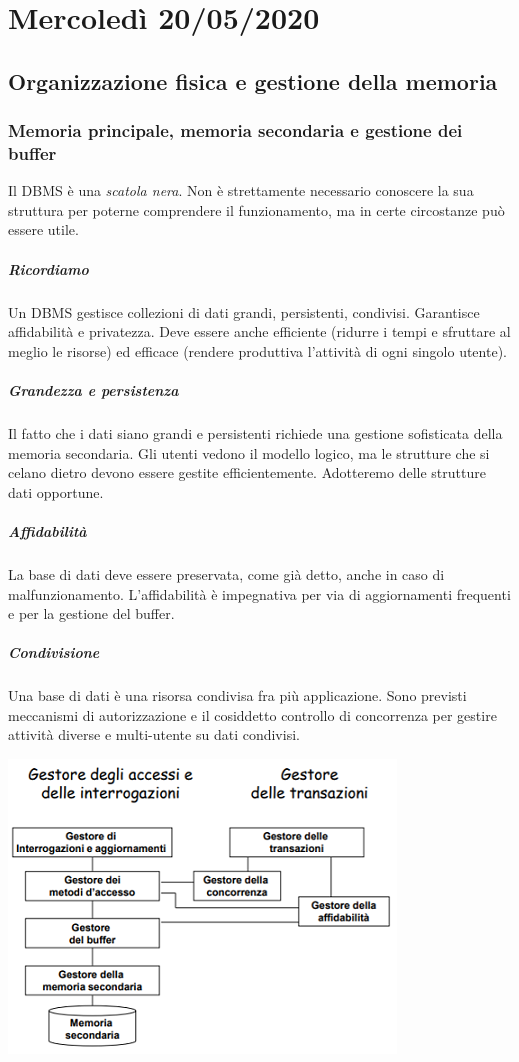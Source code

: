 \chapter{Mercoledì 20/05/2020}
\section{Organizzazione fisica e gestione della memoria}
\subsection{Memoria principale, memoria secondaria e gestione dei buffer}
Il DBMS è una \emph{scatola nera}. Non è strettamente necessario conoscere la sua struttura per poterne comprendere il funzionamento, ma in certe circostanze può essere utile.
\paragraph{Ricordiamo} Un DBMS gestisce collezioni di dati grandi, persistenti, condivisi. Garantisce affidabilità e privatezza. Deve essere anche efficiente (ridurre i tempi e sfruttare al meglio le risorse) ed efficace (rendere produttiva l'attività di ogni singolo utente).
\paragraph{Grandezza e persistenza} Il fatto che i dati siano grandi e persistenti richiede una gestione sofisticata della memoria secondaria. Gli utenti vedono il modello logico, ma le strutture che si celano dietro devono essere gestite efficientemente. Adotteremo delle strutture dati opportune.
\paragraph{Affidabilità} La base di dati deve essere preservata, come già detto, anche in caso di malfunzionamento. L'affidabilità è impegnativa per via di aggiornamenti frequenti e per la gestione del buffer.
\paragraph{Condivisione} Una base di dati è una risorsa condivisa fra più applicazione. Sono previsti meccanismi di autorizzazione e il cosiddetto controllo di concorrenza per gestire attività diverse e multi-utente su dati condivisi.
\begin{center}\includegraphics{images/174.PNG}\end{center}
